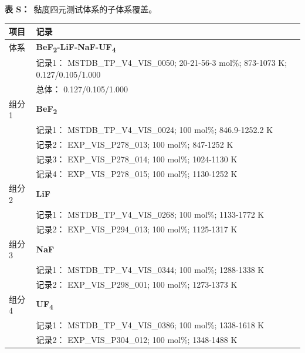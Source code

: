 \documentclass[12pt]{article}
\renewcommand{\thetable}{S\arabic{table}}
\newcommand{\sitablecaption}[1]{\Needspace{12\baselineskip}\par\noindent\stepcounter{table}\textbf{表 \thetable：}~#1\par\nobreak\smallskip}
\newcommand{\silongtablecaption}[1]{\sitablecaption{#1}\addtocounter{table}{-1}}
\begin{document}
{
\silongtablecaption{黏度四元测试体系的子体系覆盖。}
\begin{longtable}[]{@{}
  >{\raggedright\arraybackslash}p{}
  >{\raggedright\arraybackslash}p{}@{}}
\toprule\noalign{}
\begin{minipage}[b]{\linewidth}\raggedright
项目
\end{minipage} & \begin{minipage}[b]{\linewidth}\raggedright
记录
\end{minipage} \\
\midrule\noalign{}
\endhead
\bottomrule\noalign{}
\endlastfoot
体系 & \textbf{BeF\textsubscript{2}-LiF-NaF-UF\textsubscript{4}} \\
 & 记录1： MSTDB\_TP\_V4\_VIS\_0050; 20-21-56-3 mol\%; 873-1073 K; 0.127/0.105/1.000 \\
 & 总体： 0.127/0.105/1.000  \\

组分 1  & \textbf{BeF\textsubscript{2}} \\
 & 记录1： MSTDB\_TP\_V4\_VIS\_0024; 100 mol\%; 846.9-1252.2 K \\
 & 记录2： EXP\_VIS\_P278\_013; 100 mol\%; 847-1252 K \\
 & 记录3： EXP\_VIS\_P278\_014; 100 mol\%; 1024-1130 K \\
 & 记录4： EXP\_VIS\_P278\_015; 100 mol\%; 1130-1252 K  \\

组分 2  & \textbf{LiF} \\
 & 记录1： MSTDB\_TP\_V4\_VIS\_0268; 100 mol\%; 1133-1772 K \\
 & 记录2： EXP\_VIS\_P294\_013; 100 mol\%; 1125-1317 K  \\

组分 3  & \textbf{NaF} \\
 & 记录1： MSTDB\_TP\_V4\_VIS\_0344; 100 mol\%; 1288-1338 K \\
 & 记录2： EXP\_VIS\_P298\_001; 100 mol\%; 1273-1373 K  \\

组分 4  & \textbf{UF\textsubscript{4}} \\
 & 记录1： MSTDB\_TP\_V4\_VIS\_0386; 100 mol\%; 1338-1618 K \\
 & 记录2： EXP\_VIS\_P304\_012; 100 mol\%; 1348-1488 K  \\


\end{longtable}}
\end{document}
